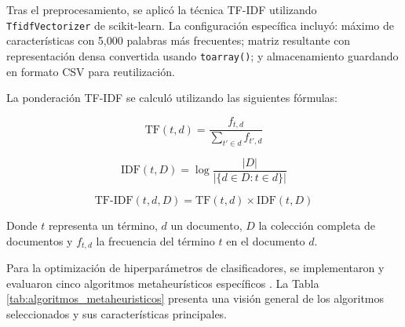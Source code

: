 Tras el preprocesamiento, se aplicó la técnica TF-IDF utilizando \texttt{TfidfVectorizer} de scikit-learn. La configuración específica incluyó: máximo de características con 5,000 palabras más frecuentes; matriz resultante con representación densa convertida usando \texttt{toarray()}; y almacenamiento guardando en formato CSV para reutilización.

La ponderación TF-IDF se calculó utilizando las siguientes fórmulas:

\begin{equation}
\text{TF}(t,d) = \frac{f_{t,d}}{\sum_{t' \in d} f_{t',d}}
\end{equation}

\begin{equation}
\text{IDF}(t,D) = \log\frac{|D|}{|\{d \in D : t \in d\}|}
\end{equation}

\begin{equation}
\text{TF-IDF}(t,d,D) = \text{TF}(t,d) \times \text{IDF}(t,D)
\end{equation}

Donde $t$ representa un término, $d$ un documento, $D$ la colección completa de documentos y $f_{t,d}$ la frecuencia del término $t$ en el documento $d$.

Para la optimización de hiperparámetros de clasificadores, se implementaron y evaluaron cinco algoritmos metaheurísticos específicos \cite{hurtado2024calibracion, bacanin2023benefits}. La Tabla \ref{tab:algoritmos_metaheuristicos} presenta una visión general de los algoritmos seleccionados y sus características principales.

